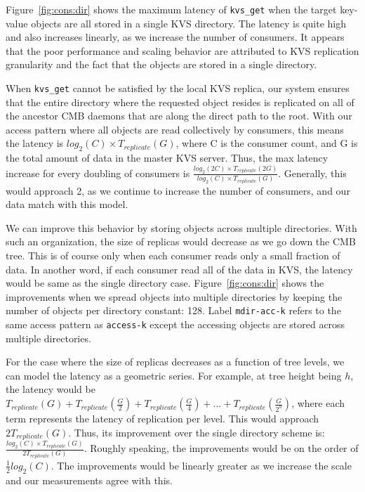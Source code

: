 Figure~\ref{fig:cons:dir} shows the maximum latency of {\tt kvs\_get}
when the target key-value objects are all stored in a single
KVS directory. The latency is quite high and also increases
linearly, as we increase the number of consumers. 
It appears that the poor performance and scaling behavior 
are attributed to KVS replication granularity and 
the fact that the objects are stored in a single directory.

When {\tt kvs\_get} cannot be satisfied by the local KVS replica,
our system ensures that the entire directory where
the requested object resides is replicated on
all of the ancestor CMB daemons that are along the direct path 
to the root. With our access pattern where all objects
are read collectively by consumers, this means the latency is 
$log_2(C) \times T_{replicate}(G)$, where C is the consumer count, and G is the 
total amount of data in the master KVS server.
Thus, the max latency increase for every doubling of consumers is 
$\frac{log_2(2C) \times T_{replicate}(2G)}{log_2(C) \times T_{replicate}(G)}$.
Generally, this would approach 2, 
as we continue to increase the number of consumers,
and our data match with this model.

We can improve this behavior by storing objects across multiple
directories. With such an organization, the size of replicas 
would decrease as we go down the CMB tree. This is of course only when
each consumer reads only a small fraction of data. In another
word, if each consumer read all of the data in KVS, the latency
would be same as the single directory case. 
Figure~\ref{fig:cons:dir} shows the improvements 
when we spread objects into multiple directories by
keeping the number of objects per directory constant: 128.
Label {\tt mdir-acc-k} refers to the same access pattern as {\tt access-k} 
except the accessing objects are stored across multiple directories.


For the case where the size of replicas 
decreases as a function of tree levels, 
we can model the latency as a geometric series. For example, at tree height being $h$,
the latency would be 
$T_{replicate}(G) + T_{replicate}(\frac{G}{2}) + T_{replicate}(\frac{G}{4}) + ... + T_{replicate}(\frac{G}{2^h})$, 
where each term represents the latency of replication per level.
This would approach $2T_{replicate}(G)$. Thus, its improvement over the single
directory scheme is: $\frac{log_2(C) \times T_{replicate}(G)}{2 T_{replicate}(G)}$.
Roughly speaking, the improvements would be on the order of 
$\frac{1}{2}log_2(C)$. The improvements would be linearly 
greater as we increase the scale and our measurements agree with this. 

